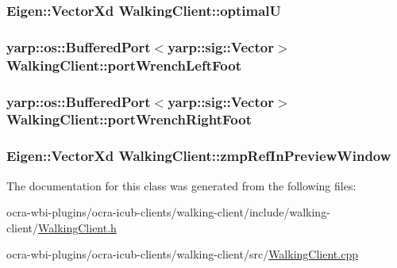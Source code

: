 \hypertarget{classWalkingClient_a0e5aee88e377029d79f57e778c583f18}{
\subsubsection[{optimal\-U}]{\setlength{\rightskip}{0pt plus 5cm}\-Eigen\-::\-Vector\-Xd {\bf \-Walking\-Client\-::optimal\-U}}}\label{classWalkingClient_a0e5aee88e377029d79f57e778c583f18}
\hypertarget{classWalkingClient_a88ee63ff6a341eccd458d24700383457}{
\subsubsection[{port\-Wrench\-Left\-Foot}]{\setlength{\rightskip}{0pt plus 5cm}yarp\-::os\-::\-Buffered\-Port$<$yarp\-::sig\-::\-Vector$>$ {\bf \-Walking\-Client\-::port\-Wrench\-Left\-Foot}}}\label{classWalkingClient_a88ee63ff6a341eccd458d24700383457}
\hypertarget{classWalkingClient_a96321dc60e84c193f2dea6e85983ca67}{
\subsubsection[{port\-Wrench\-Right\-Foot}]{\setlength{\rightskip}{0pt plus 5cm}yarp\-::os\-::\-Buffered\-Port$<$yarp\-::sig\-::\-Vector$>$ {\bf \-Walking\-Client\-::port\-Wrench\-Right\-Foot}}}\label{classWalkingClient_a96321dc60e84c193f2dea6e85983ca67}
\hypertarget{classWalkingClient_af28b3cd3b1202f83e193b098572fbdd3}{
\subsubsection[{zmp\-Ref\-In\-Preview\-Window}]{\setlength{\rightskip}{0pt plus 5cm}\-Eigen\-::\-Vector\-Xd {\bf \-Walking\-Client\-::zmp\-Ref\-In\-Preview\-Window}}}\label{classWalkingClient_af28b3cd3b1202f83e193b098572fbdd3}


\-The documentation for this class was generated from the following files\-:\begin{DoxyCompactItemize}
\item 
ocra-\/wbi-\/plugins/ocra-\/icub-\/clients/walking-\/client/include/walking-\/client/\hyperlink{WalkingClient_8h}{\-Walking\-Client.\-h}\item 
ocra-\/wbi-\/plugins/ocra-\/icub-\/clients/walking-\/client/src/\hyperlink{WalkingClient_8cpp}{\-Walking\-Client.\-cpp}\end{DoxyCompactItemize}

